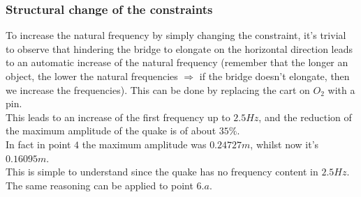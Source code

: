 \documentclass[10pt,a4paper,final]{report}
\begin{document}
\subsubsection{Structural change of the constraints}
To increase the natural frequency by simply changing the constraint, it's trivial to observe that hindering the bridge to elongate on the horizontal direction leads to an automatic increase of the natural frequency (remember that the longer an object, the lower the natural frequencies $\Rightarrow$ if the bridge doesn't elongate, then we increase the frequencies). This can be done by replacing the cart on $O_2$ with a pin. 
\\
This leads to an increase of the first frequency up to $2.5 Hz$, and the reduction of the maximum amplitude of the quake is of about $35\%$. 
\\
In fact in point $4$ the maximum amplitude was $0.24727 m$, whilst now it's  $0.16095m$.\\
This is simple to understand since the quake has no frequency content in $2.5 Hz$. The same reasoning can be applied to point $6.a$.
\end{document}
